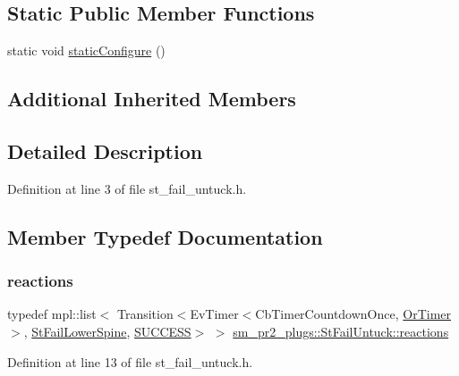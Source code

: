 \subsection*{Static Public Member Functions}
\begin{DoxyCompactItemize}
\item 
static void \hyperlink{structsm__pr2__plugs_1_1StFailUntuck_abd604f84f00dc9f4e8f9ffaae1f1340b}{static\+Configure} ()
\end{DoxyCompactItemize}
\subsection*{Additional Inherited Members}


\subsection{Detailed Description}


Definition at line 3 of file st\+\_\+fail\+\_\+untuck.\+h.



\subsection{Member Typedef Documentation}
\mbox{\label{structsm__pr2__plugs_1_1StFailUntuck_a0bdd7212772e86a51482f6b7cd162866}} 
\subsubsection{\texorpdfstring{reactions}{reactions}}
{\footnotesize\ttfamily typedef mpl\+::list$<$ Transition$<$Ev\+Timer$<$Cb\+Timer\+Countdown\+Once, \hyperlink{classsm__pr2__plugs_1_1OrTimer}{Or\+Timer}$>$, \hyperlink{structsm__pr2__plugs_1_1StFailLowerSpine}{St\+Fail\+Lower\+Spine}, \hyperlink{classSUCCESS}{S\+U\+C\+C\+E\+SS}$>$ $>$ \hyperlink{structsm__pr2__plugs_1_1StFailUntuck_a0bdd7212772e86a51482f6b7cd162866}{sm\+\_\+pr2\+\_\+plugs\+::\+St\+Fail\+Untuck\+::reactions}}



Definition at line 13 of file st\+\_\+fail\+\_\+untuck.\+h.



